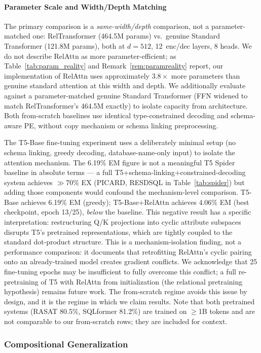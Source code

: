 \documentclass[review]{elsarticle}
\begin{document}
\paragraph{Parameter Scale and Width/Depth Matching}
The primary comparison is a \emph{same-width/depth} comparison, not a parameter-matched one: RelTransformer (464.5M params) vs.\ genuine Standard Transformer (121.8M params), both at $d{=}512$, 12~enc/dec layers, 8 heads. We do not describe RelAttn as more parameter-efficient; as Table~\ref{tab:param_reality} and Remark~\ref{rem:paramreality} report, our implementation of RelAttn uses approximately $3.8\times$ more parameters than genuine standard attention at this width and depth. We additionally evaluate against a parameter-matched genuine Standard Transformer (FFN widened to match RelTransformer's 464.5M exactly) to isolate capacity from architecture. Both from-scratch baselines use identical type-constrained decoding and schema-aware PE, without copy mechanism or schema linking preprocessing.

The T5-Base fine-tuning experiment uses a deliberately minimal setup (no schema linking, greedy decoding, database-name-only input) to isolate the attention mechanism. The 6.19\% EM figure is not a meaningful T5 Spider baseline in absolute terms --- a full T5+schema-linking+constrained-decoding system achieves $\gg$70\% EX (PICARD, RESDSQL in Table~\ref{tab:spider}) but adding those components would confound the mechanism-level comparison. T5-Base achieves 6.19\% EM (greedy); T5-Base+RelAttn achieves 4.06\% EM (best checkpoint, epoch 13/25), \emph{below} the baseline. This negative result has a specific interpretation: restructuring Q/K projections into cyclic attribute subspaces disrupts T5's pretrained representations, which are tightly coupled to the standard dot-product structure. This is a {mechanism-isolation finding}, not a performance comparison: it documents that retrofitting RelAttn's cyclic pairing onto an already-trained model creates gradient conflicts. We acknowledge that 25 fine-tuning epochs may be insufficient to fully overcome this conflict; a full re-pretraining of T5 with RelAttn from initialization (the relational pretraining hypothesis) remains future work. The from-scratch regime avoids this issue by design, and it is the regime in which we claim results. Note that both pretrained systems (RASAT 80.5\%, SQLformer 81.2\%) are trained on $\geq$1B tokens and are not comparable to our from-scratch rows; they are included for context.

\subsubsection{Compositional Generalization}
\end{document}
